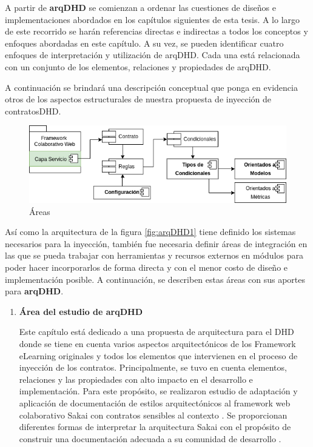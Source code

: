 {A partir de \textbf{arqDHD} se comienzan a ordenar las cuestiones de diseños e implementaciones abordados en los capítulos siguientes de esta tesis. A lo largo de este recorrido se harán referencias directas e indirectas a todos los conceptos y enfoques abordadas en este capítulo. A su vez, se pueden identificar cuatro enfoques de interpretación y utilización de arqDHD. Cada una está relacionada con un conjunto de los elementos, relaciones y propiedades de arqDHD. 


A continuación se brindará una descripción conceptual que ponga en evidencia otros de los aspectos estructurales de nuestra propuesta de inyección de contratosDHD.


\begin{figure}
\begin{center}
 \includegraphics[scale=0.55]{Ch2/arqAreas.png}
 \caption{Áreas } \label{fig:arqAreas}
\end{center}
\end{figure}



Así como la arquitectura de la figura \ref{fig:arqDHD1} tiene definido los sistemas necesarios para la inyección, también fue necesaria definir áreas de integración en las que se pueda trabajar con herramientas y recursos externos en módulos para poder hacer incorporarlos de forma directa y con el menor costo de diseño e implementación posible. A continuación, se describen estas áreas con sus aportes para \textbf{arqDHD}.

\begin{enumerate}

\item \textbf{Área del estudio de arqDHD}
 
Este capítulo está dedicado a una propuesta de arquitectura para el DHD donde se tiene en cuenta varios aspectos arquitectónicos de los Framework eLearning originales y todos los elementos que intervienen en el proceso de inyección de los contratos. Principalmente, se tuvo en cuenta elementos, relaciones y las propiedades con alto impacto en el desarrollo e implementación. Para este propósito, se realizaron estudio de adaptación y aplicación de documentación de estilos arquitectónicos al framework web colaborativo Sakai con contratos sensibles al contexto \cite{arqDHD21}. Se proporcionan diferentes formas de interpretar la arquitectura Sakai con el propósito de construir una documentación adecuada a su comunidad de desarrollo \cite{arqDHD18}.


\end{enumerate}}
